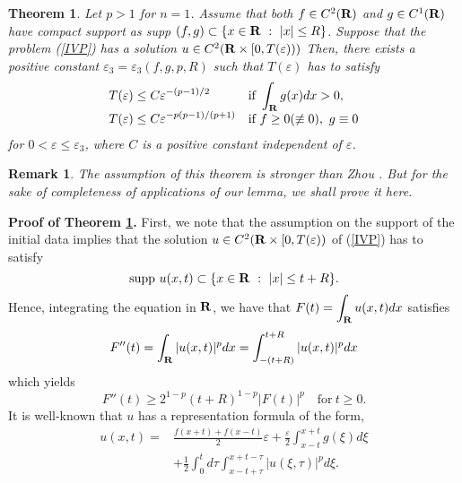 \documentclass[a4paper,12pt]{article}
\numberwithin{equation}{section}
\def\R{{\bf R}}
\def\d{\displaystyle}
\def\e{{\varepsilon}}
\newtheorem{thm}{Theorem}[section]
\newtheorem{rem}{Remark}[section]
\begin{document}
\begin{thm}
\label{thm:1d}
Let $p>1$ for $n=1$.
Assume that both $f\in C^2(\R)$ and $g\in C^1(\R)$
have compact support as {\rm supp} $(f,g)\subset\{x\in\R\ :\ |x|\le R\}$.
Suppose that the problem {\rm(\ref{IVP})} has a solution
$u\in C^2(\R\times[0,T(\e)))$
Then, there exists a positive constant $\e_3
=\e_3(f,g,p,R)$ such that $T(\e)$ has to satisfy
\begin{equation}
\label{lifespan_1d_u}
\begin{array}{ll}
\d T(\e)\le C \e^{-(p-1)/2} & \d\mbox{if}\ \int_{\R}g(x)dx>0,\\
\d T(\e)\le C\e^{-p(p-1)/(p+1)} &\d\mbox{if}\ f\ge0(\not\equiv0),\ g\equiv0
\end{array}
\end{equation}
for $0<\e\le\e_3$, where $C$ is a positive constant independent of $\e$.
\end{thm}
\begin{rem}
The assumption of this theorem is stronger than Zhou \cite{Z92_one}.
But for the sake of completeness of applications of our lemma, we shall prove it here.
\end{rem}
\par\noindent
{\bf Proof of Theorem \ref{thm:1d}.}
First, we note that the assumption on the support of the initial data implies that
the solution $u\in C^2(\R\times[0,T(\e))$
of (\ref{IVP}) has to satisfy
\[
\mbox{supp}\ u(x,t)\subset\{x\in\R\ :\ |x|\le t+R\}.
\]
Hence, integrating the equation in $\R$, we have that $\d F(t)=\int_{\R}u(x,t)dx$ satisfies
\begin{equation}
\label{F''_1d}
F''(t)=\int_{\R}|u(x,t)|^pdx=\int_{-(t+R)}^{t+R}|u(x,t)|^pdx
\end{equation}
which yields
\begin{equation}
\label{ineq:B_1d}
F''(t)\ge2^{1-p}(t+R)^{1-p}|F(t)|^p
\quad\mbox{for}\ t\ge0.
\end{equation}
It is well-known that $u$ has a representation formula of the form,
\begin{equation}
\label{rep_1d}
\begin{array}{ll}
u(x,t)=
&\d\frac{f(x+t)+f(x-t)}{2}\e+\frac{\e}{2}\int_{x-t}^{x+t}g(\xi)d\xi\\
&\d+\frac{1}{2}\int_0^td\tau\int_{x-t+\tau}^{x+t-\tau}|u(\xi,\tau)|^pd\xi.
\end{array}
\end{equation}
\vskip10pt
\par\noindent
\end{document}
